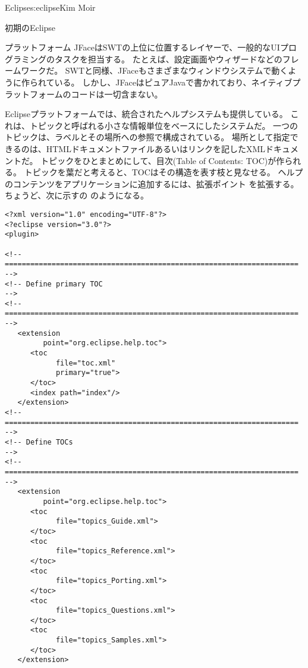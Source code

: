 \begin{aosachapter}{Eclipse}{s:eclipse}{Kim Moir}
\begin{aosasect1}{初期のEclipse}
\begin{aosasect2}{プラットフォーム}
JFaceはSWTの上位に位置するレイヤーで、一般的なUIプログラミングのタスクを担当する。
たとえば、設定画面やウィザードなどのフレームワークだ。
SWTと同様、JFaceもさまざまなウィンドウシステムで動くように作られている。
しかし、JFaceはピュアJavaで書かれており、ネイティブプラットフォームのコードは一切含まない。

Eclipseプラットフォームでは、統合されたヘルプシステムも提供している。
これは、トピックと呼ばれる小さな情報単位をベースにしたシステムだ。
一つのトピックは、ラベルとその場所への参照で構成されている。
場所として指定できるのは、HTMLドキュメントファイルあるいはリンクを記したXMLドキュメントだ。
トピックをひとまとめにして、目次(Table of Contents: TOC)が作られる。
トピックを葉だと考えると、TOCはその構造を表す枝と見なせる。
ヘルプのコンテンツをアプリケーションに追加するには、拡張ポイント
を拡張する。ちょうど、次に示すの
のようになる。

\begin{verbatim}
<?xml version="1.0" encoding="UTF-8"?>
<?eclipse version="3.0"?>
<plugin>

<!-- ===================================================================== -->
<!-- Define primary TOC                                                    -->
<!-- ===================================================================== -->
   <extension
         point="org.eclipse.help.toc">
      <toc
            file="toc.xml"
            primary="true">
      </toc>
      <index path="index"/>
   </extension>
<!-- ===================================================================== -->
<!-- Define TOCs                                                           -->
<!-- ===================================================================== -->
   <extension
         point="org.eclipse.help.toc">
      <toc
            file="topics_Guide.xml">
      </toc>
      <toc
            file="topics_Reference.xml">
      </toc>
      <toc
            file="topics_Porting.xml">
      </toc>
      <toc
            file="topics_Questions.xml">
      </toc>
      <toc
            file="topics_Samples.xml">
      </toc>
   </extension>
\end{verbatim}


\end{aosasect2}
\end{aosasect1}
\end{aosachapter}
